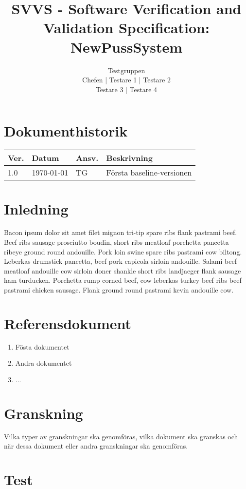 \documentclass[a4paper]{article}
\title{SVVS - Software Verification and Validation Specification: NewPussSystem}
\author{Testgruppen \\ Chefen | Testare 1 | Testare 2 \\ Testare 3 | Testare 4}
\date{}
\begin{document}
\maketitle
\thispagestyle{fancy}
\tableofcontents
\newpage

\section*{Dokumenthistorik}

\begin{tabular}{ l l l l }
Ver. & Datum & Ansv. & Beskrivning \\\hline
1.0 & \today & TG & Första baseline-versionen

\end{tabular}
\section{Inledning}       

Bacon ipsum dolor sit amet filet mignon tri-tip spare ribs flank pastrami beef. Beef ribs sausage prosciutto boudin, short ribs meatloaf porchetta pancetta ribeye ground round andouille. Pork loin swine spare ribs pastrami cow biltong. Leberkas drumstick pancetta, beef pork capicola sirloin andouille. Salami beef meatloaf andouille cow sirloin doner shankle short ribs landjaeger flank sausage ham turducken. Porchetta rump corned beef, cow leberkas turkey beef ribs beef pastrami chicken sausage. Flank ground round pastrami kevin andouille cow.

\section{Referensdokument}
\begin{enumerate}
\item Fösta dokumentet
\item Andra dokumentet
\item ...

\end{enumerate}

\section{Granskning}
Vilka typer av granskningar ska genomföras, vilka dokument ska granskas och när dessa dokument eller andra granskningar ska genomföras.

\section{Test}
\end{document}
